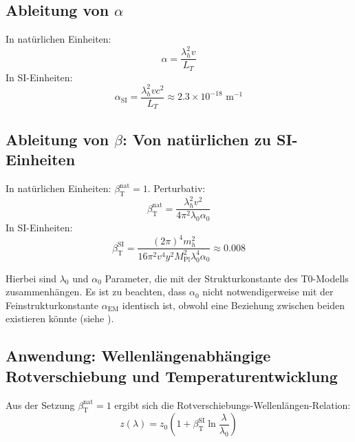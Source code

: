 \documentclass[12pt,a4paper]{article}
\newcommand{\Mpl}{M_{\text{Pl}}}
\newcommand{\alphaEM}{\alpha_{\text{EM}}}
\newcommand{\betaT}{\beta_{\text{T}}}
\begin{document}
	\subsection{Ableitung von \(\alpha\)}
	
	\begin{theorem}
		In natürlichen Einheiten:
		\begin{equation}
			\alpha = \frac{\lambda_h^2 v}{L_T}
		\end{equation}
		In SI-Einheiten:
		\begin{equation}
			\alpha_{\text{SI}} = \frac{\lambda_h^2 v c^2}{L_T} \approx 2.3 \times 10^{-18} \text{ m}^{-1}
		\end{equation}
	\end{theorem}
	
	\subsection{Ableitung von \(\beta\): Von natürlichen zu SI-Einheiten}
	
	\begin{theorem}
		In natürlichen Einheiten: \(\betaT^{\text{nat}} = 1\). Perturbativ:
		\begin{equation}
			\betaT^{\text{nat}} = \frac{\lambda_h^2 v^2}{4\pi^2 \lambda_0 \alpha_0}
		\end{equation}
		In SI-Einheiten:
		\begin{equation}
			\betaT^{\text{SI}} = \frac{(2\pi)^4 m_h^2}{16 \pi^2 v^4 y^2 \Mpl^2 \lambda_0^4 \alpha_0} \approx 0.008
		\end{equation}
	\end{theorem}
	
	Hierbei sind $\lambda_0$ und $\alpha_0$ Parameter, die mit der Strukturkonstante des T0-Modells zusammenhängen. Es ist zu beachten, dass $\alpha_0$ nicht notwendigerweise mit der Feinstrukturkonstante $\alphaEM$ identisch ist, obwohl eine Beziehung zwischen beiden existieren könnte (siehe \cite{pascher_alphabeta_2025}).
	
	\subsection{Anwendung: Wellenlängenabhängige Rotverschiebung und Temperaturentwicklung}
	
	Aus der Setzung \(\betaT^{\text{nat}} = 1\) ergibt sich die Rotverschiebungs-Wellenlängen-Relation:
	\begin{equation}
		z(\lambda) = z_0 \left(1 + \betaT^{\text{SI}} \ln \frac{\lambda}{\lambda_0}\right)
	\end{equation}
	
\end{document}

